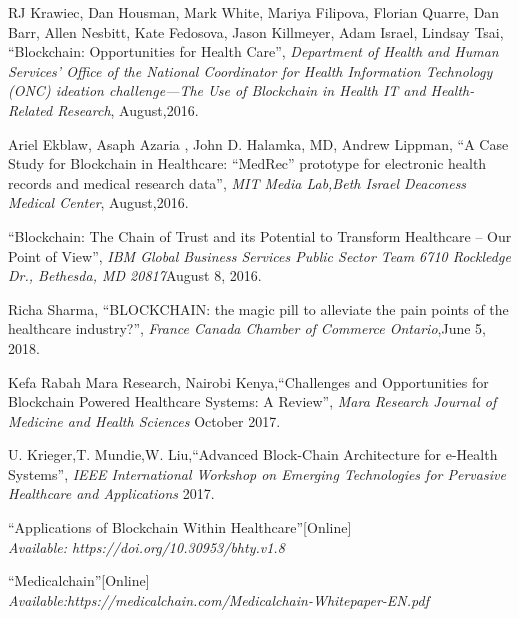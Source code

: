 \documentclass[12pt]{report}
\begin{document}
\begin{thebibliography}{100} 

 RJ Krawiec, Dan Housman, Mark White, Mariya Filipova,
Florian Quarre, Dan Barr, Allen Nesbitt, Kate Fedosova,
Jason Killmeyer, Adam Israel, Lindsay Tsai, \textquotedblleft Blockchain:
Opportunities for Health Care\textquotedblright, \textit{Department of Health and Human Services’ Office of the National Coordinator for Health
Information Technology (ONC) ideation challenge—The Use of Blockchain in Health IT and Health-Related Research}, August,2016.


 Ariel Ekblaw, Asaph Azaria , John D. Halamka, MD, Andrew Lippman, \textquotedblleft A Case Study for Blockchain in Healthcare:
“MedRec” prototype for electronic health records and medical research data\textquotedblright, \textit{MIT Media Lab,Beth Israel Deaconess Medical Center}, August,2016.


 \textquotedblleft Blockchain: The Chain of Trust and its Potential to Transform Healthcare – Our Point of View\textquotedblright, \textit{IBM Global Business Services Public Sector Team 6710 Rockledge Dr., Bethesda, MD 20817}August 8, 2016.

 Richa Sharma, \textquotedblleft BLOCKCHAIN: the magic pill to alleviate the pain
points of the healthcare industry?\textquotedblright, \textit{France Canada Chamber of Commerce Ontario},June 5, 2018.

Kefa Rabah Mara Research, Nairobi Kenya,\textquotedblleft Challenges and Opportunities for Blockchain Powered Healthcare Systems: A Review\textquotedblright, \textit{Mara Research Journal of Medicine and Health Sciences} October 2017.

U. Krieger,T. Mundie,W. Liu,\textquotedblleft Advanced Block-Chain Architecture for e-Health Systems\textquotedblright, \textit{IEEE International
Workshop on Emerging Technologies for Pervasive Healthcare and Applications} 2017.


 \textquotedblleft Applications of Blockchain Within Healthcare\textquotedblright[Online]\\ 
\textit{Available: https://doi.org/10.30953/bhty.v1.8}


 \textquotedblleft Medicalchain\textquotedblright[Online]\\ 
\textit{Available:https://medicalchain.com/Medicalchain-Whitepaper-EN.pdf}


\vspace{2cm}

\end{thebibliography}
\end{document}
